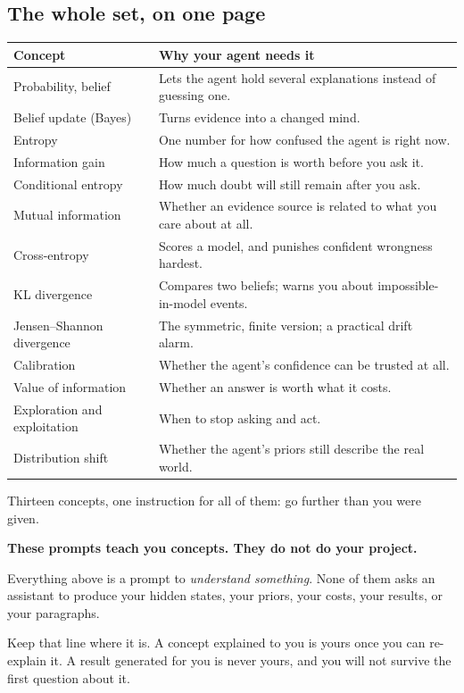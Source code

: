 \documentclass[11pt,a4paper]{article}
\newcommand{\boxtitle}[1]{{\bfseries #1}\par\vspace{2pt}}
\begin{document}
\subsection{The whole set, on one page}

\begin{center}
\small
\begin{tabular}{@{}L{4.2cm}L{10.4cm}@{}}
\toprule
\textbf{Concept} & \textbf{Why your agent needs it} \\
\midrule
Probability, belief   & Lets the agent hold several explanations instead of guessing one. \\
Belief update (Bayes) & Turns evidence into a changed mind. \\
Entropy               & One number for how confused the agent is right now. \\
Information gain      & How much a question is worth before you ask it. \\
Conditional entropy   & How much doubt will still remain after you ask. \\
Mutual information    & Whether an evidence source is related to what you care about at all. \\
Cross-entropy         & Scores a model, and punishes confident wrongness hardest. \\
KL divergence         & Compares two beliefs; warns you about impossible-in-model events. \\
Jensen--Shannon divergence & The symmetric, finite version; a practical drift alarm. \\
Calibration           & Whether the agent's confidence can be trusted at all. \\
Value of information  & Whether an answer is worth what it costs. \\
Exploration and exploitation & When to stop asking and act. \\
Distribution shift    & Whether the agent's priors still describe the real world. \\
\bottomrule
\end{tabular}
\end{center}

Thirteen concepts, one instruction for all of them: go further than you were given.

\begin{sbbox}
\boxtitle{These prompts teach you concepts. They do not do your project.}
Everything above is a prompt to \emph{understand something}. None of them asks an assistant to
produce your hidden states, your priors, your costs, your results, or your paragraphs.

Keep that line where it is. A concept explained to you is yours once you can re-explain it. A
result generated for you is never yours, and you will not survive the first question about it.
\end{sbbox}
\end{document}
